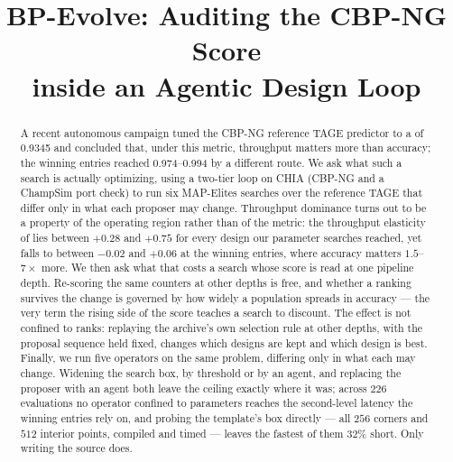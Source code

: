 \documentclass[conference]{IEEEtran}
\newcommand{\vfs}{\text{VFS}}
\begin{document}
\title{BP-Evolve: Auditing the CBP-NG Score\\inside an Agentic Design Loop}

\author{
\and
{}
}

\maketitle

\begin{abstract}
A recent autonomous campaign tuned the CBP-NG reference TAGE predictor to a
\vfs{} of 0.9345 and concluded that, under this metric, throughput matters more
than accuracy; the winning entries reached 0.974--0.994 by a different route.
We ask what such a search is actually optimizing, using a two-tier loop on
CHIA (CBP-NG and a ChampSim port check) to run six MAP-Elites searches over the
reference TAGE that differ only in what each proposer may change. Throughput
dominance turns out to be a property of the operating region rather than of the
metric: the throughput elasticity of \vfs{} lies between $+0.28$ and $+0.75$ for
every design our parameter searches reached, yet falls to between $-0.02$ and $+0.06$ at the
winning entries, where accuracy matters $1.5$--$7\times$ more. We then ask what
that costs a search whose score is read at one pipeline depth. Re-scoring the
same counters at other depths is free, and whether a ranking survives the change
is governed by how widely a population spreads in accuracy --- the very term the
rising side of the score teaches a search to discount.
The effect is not confined to ranks: replaying the archive's own selection rule
at other depths, with the proposal sequence held fixed, changes which designs
are kept and which design is best. Finally, we run five operators on the same
problem, differing only in what each may change. Widening the search box, by
threshold or by an agent, and replacing the proposer with an agent both leave
the ceiling exactly where it was; across $226$ evaluations no operator confined
to parameters reaches the second-level latency the winning entries rely on, and
probing the template's box directly --- all $256$ corners and $512$ interior
points, compiled and timed --- leaves the fastest of them $32\%$ short. Only
writing the source does.
\end{abstract}
\end{document}
